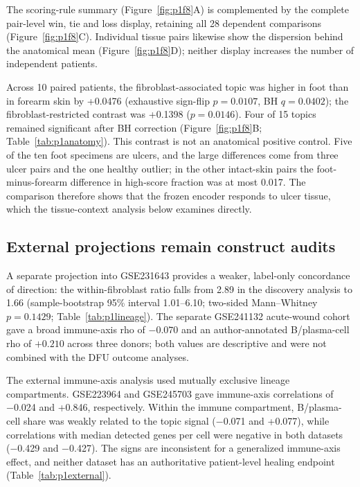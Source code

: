 \documentclass[10pt,a4paper]{article}
\begin{document}
The scoring-rule summary (Figure~\ref{fig:p1f8}A\label{call:p1f8}) is complemented by the complete pair-level win, tie and loss display, retaining all 28 dependent comparisons (Figure~\ref{fig:p1f8}C). Individual tissue pairs likewise show the dispersion behind the anatomical mean (Figure~\ref{fig:p1f8}D); neither display increases the number of independent patients.

Across 10 paired patients, the fibroblast-associated topic was higher in foot than in forearm skin by +0.0476 (exhaustive sign-flip $p=0.0107$, BH $q=0.0402$); the fibroblast-restricted contrast was +0.1398 ($p=0.0146$). Four of 15 topics remained significant after BH correction (Figure~\ref{fig:p1f8}B; Table~\ref{tab:p1anatomy}). This contrast is not an anatomical positive control. Five of the ten foot specimens are ulcers, and the large differences come from three ulcer pairs and the one healthy outlier; in the other intact-skin pairs the foot-minus-forearm difference in high-score fraction was at most 0.017. The comparison therefore shows that the frozen encoder responds to ulcer tissue, which the tissue-context analysis below examines directly.

\subsection{External projections remain construct audits}

A separate projection into GSE231643 provides a weaker, label-only concordance of direction: the within-fibroblast ratio falls from 2.89 in the discovery analysis to 1.66 (sample-bootstrap 95\% interval 1.01--6.10; two-sided Mann--Whitney $p=0.1429$; Table~\ref{tab:p1lineage}). The separate GSE241132 acute-wound cohort gave a broad immune-axis rho of $-0.070$ and an author-annotated B/plasma-cell rho of $+0.210$ across three donors; both values are descriptive and were not combined with the DFU outcome analyses.

The external immune-axis analysis used mutually exclusive lineage compartments. GSE223964 and GSE245703 gave immune-axis correlations of −0.024 and +0.846, respectively. Within the immune compartment, B/plasma-cell share was weakly related to the topic signal (−0.071 and +0.077), while correlations with median detected genes per cell were negative in both datasets (−0.429 and −0.427). The signs are inconsistent for a generalized immune-axis effect, and neither dataset has an authoritative patient-level healing endpoint (Table~\ref{tab:p1external}).
\end{document}
